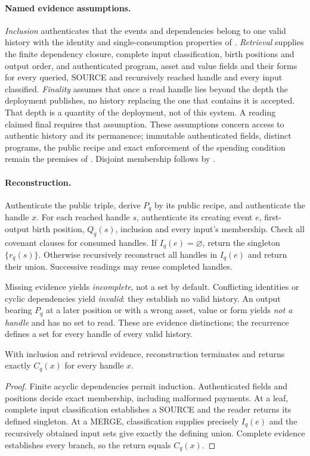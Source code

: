 \documentclass[../main.tex]{subfiles}
\begin{document}
\paragraph{Named evidence assumptions.}
\emph{Inclusion} authenticates that the events and dependencies belong
to one valid history with the identity and single-consumption properties
of .
\emph{Retrieval} supplies the finite dependency closure, complete input
classification, birth positions and output order, and authenticated
program, asset and value fields and their forms for every queried,
SOURCE and recursively reached handle and every input classified.
\emph{Finality} assumes that once a read handle lies beyond the depth the
deployment publishes, no history replacing the one that contains it is
accepted. That depth is a quantity of the deployment, not of this system.
A reading claimed final requires that assumption.
These assumptions concern access to authentic history and its permanence;
immutable authenticated fields, distinct programs, the public recipe and
exact enforcement of the spending condition remain the premises of
. Disjoint membership follows by
.

\paragraph{Reconstruction.}
Authenticate the public triple, derive $P_q$ by its public recipe, and
authenticate the handle $x$. For each reached handle
$s$, authenticate its creating event $e$, first-output birth position,
$Q_q(s)$, inclusion and every input's membership. Check all covenant clauses for consumed
handles. If $I_q(e)=\varnothing$, return the singleton $\{r_q(s)\}$.
Otherwise recursively reconstruct all handles in $I_q(e)$ and return
their union. Successive readings may reuse completed handles.

Missing evidence yields \emph{incomplete}, not a set by default.
Conflicting identities or cyclic dependencies yield \emph{invalid}: they
establish no valid history. An output bearing $P_q$ at a later position
or with a wrong asset, value or form yields \emph{not a handle} and has no
set to read. These are evidence distinctions; the recurrence defines a set
for every handle of every valid history.

\begin{theorem}
\label{thm:kpcfixed-interface:membership-correctness}
With inclusion and retrieval evidence, reconstruction terminates and
returns exactly $C_q(x)$ for every handle $x$.
\end{theorem}
\begin{proof}
Finite acyclic dependencies permit induction. Authenticated fields and
positions decide exact membership, including malformed payments. At a leaf, complete input
classification establishes a SOURCE and the reader returns its defined
singleton. At a MERGE, classification supplies precisely $I_q(e)$ and
the recursively obtained input sets give exactly the defining union.
Complete evidence establishes every branch, so the return equals $C_q(x)$.
\end{proof}
\end{document}
